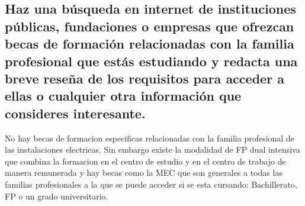 
\fsection{\boldit{\textcolor{waveBlue2}{UTILIZA LAS TIC.}}} 
\subsection*{Haz una búsqueda en internet de instituciones públicas, fundaciones o empresas que ofrezcan becas de formación relacionadas con la familia profesional que estás estudiando y redacta una breve reseña de los requisitos para acceder a ellas o cualquier otra información que consideres interesante.}

\begin{solution}
	No hay becas de formacion especificas relacionadas con la familia profesional de las instalaciones electricas. Sin embargo existe la modalidad de FP dual intensiva que combina la formacion en el centro de estudio
	y en el centro de trabajo de manera remunerada y hay becas como la MEC que son generales a todas las familias profesionales a la que se puede acceder si se esta cursando: Bachillerato, FP o un grado universitario.
\end{solution}
